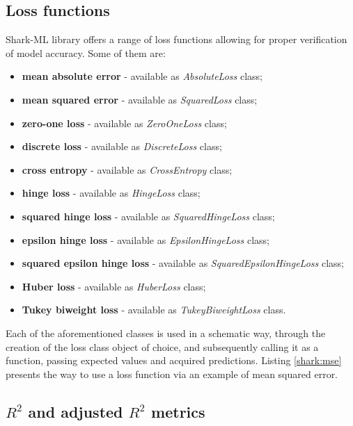 \subsection{Loss functions}

Shark-ML library offers a range of loss functions allowing for proper verification of model accuracy. Some of them are\cite{shark:loss}: 

\begin{itemize}
	\item \textbf{mean absolute error} - available as \textit{AbsoluteLoss} class;
	\item \textbf{mean squared error} - available as \textit{SquaredLoss} class;
	\item \textbf{zero-one loss} - available as \textit{ZeroOneLoss} class;
	\item \textbf{discrete loss} - available as \textit{DiscreteLoss} class;
	\item \textbf{cross entropy} - available as \textit{CrossEntropy} class;
	\item \textbf{hinge loss} - available as \textit{HingeLoss} class;
	\item \textbf{squared hinge loss} - available as \textit{SquaredHingeLoss} class;
	\item \textbf{epsilon hinge loss} - available as \textit{EpsilonHingeLoss} class;
	\item \textbf{squared epsilon hinge loss} - available as \textit{SquaredEpsilonHingeLoss} class;
	\item \textbf{Huber loss} - available as \textit{HuberLoss} class;
	\item \textbf{Tukey biweight loss} - available as \textit{TukeyBiweightLoss} class.
\end{itemize}

Each of the aforementioned classes is used in a schematic way, through the creation of the loss class object of choice, and subsequently calling it as a function, passing expected values and acquired predictions. Listing \ref{shark:mse} presents the way to use a loss function via an example of mean squared error.


\subsection{$R^2$ and adjusted $R^2$ metrics}

